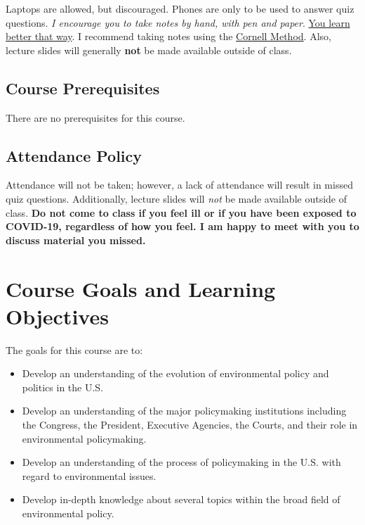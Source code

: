\vspace{0.1in}

\noindent Laptops are allowed, but discouraged. Phones are only to be
used to answer quiz questions. \emph{I encourage you to take notes by
hand, with pen and paper}.
\href{https://www.nytimes.com/2017/11/27/learning/should-teachers-and-professors-ban-student-use-of-laptops-in-class.html}{You
learn better that way}. I recommend taking notes using the
\href{http://www.usu.edu/arc/idea_sheets/pdf/note_taking_cornell.pdf}{Cornell
Method}. Also, lecture slides will generally \textbf{not} be made
available outside of class.

\hypertarget{course-prerequisites}{%
\subsection{Course Prerequisites}\label{course-prerequisites}}

There are no prerequisites for this course.

\hypertarget{attendance-policy}{%
\subsection{Attendance Policy}\label{attendance-policy}}

Attendance will not be taken; however, a lack of attendance will result
in missed quiz questions. Additionally, lecture slides will \emph{not}
be made available outside of class. \textbf{Do not come to class if you
feel ill or if you have been exposed to COVID-19, regardless of how you
feel. I am happy to meet with you to discuss material you missed.}

\hypertarget{course-goals-and-learning-objectives}{%
\section{Course Goals and Learning
Objectives}\label{course-goals-and-learning-objectives}}

The goals for this course are to:

\begin{itemize}
\item
  Develop an understanding of the evolution of environmental policy and
  politics in the U.S.
\item
  Develop an understanding of the major policymaking institutions
  including the Congress, the President, Executive Agencies, the Courts,
  and their role in environmental policymaking.
\item
  Develop an understanding of the process of policymaking in the U.S.
  with regard to environmental issues.
\item
  Develop in-depth knowledge about several topics within the broad field
  of environmental policy.
\end{itemize}

